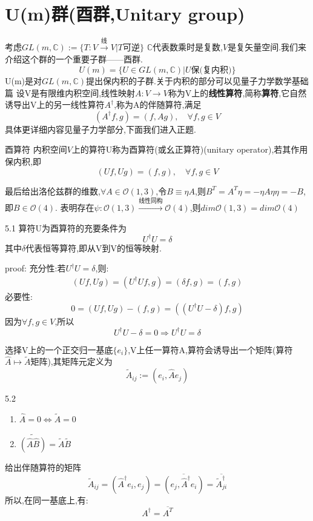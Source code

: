 \documentclass[../main.tex]{subfiles}
\begin{document}
 \section{U(m)群(酉群,Unitary group)}
 考虑$GL(m,\mathbb{C}):= \{T:V\xrightarrow{\text{线}}V|T\text{可逆}\}$ $\mathbb{C}$代表数乘时是复数,$V$是复矢量空间.我们来介绍这个群的一个重要子群——酉群.
 $$U(m) = \{U\in GL(m, \mathbb{C})|U\text{保(复内积)}\}$$
 U(m)是对$GL(m,\mathbb{C})$提出保内积的子群.关于内积的部分可以见量子力学数学基础篇%
 设V是有限维内积空间,线性映射$A:V\rightarrow V$称为V上的\textbf{线性算符},简称\textbf{算符},它自然诱导出V上的另一线性算符$A^\dagger$,称为A的伴随算符,满足
 $$(A^\dagger f,g) = (f,Ag),\quad \forall f,g \in V$$
 具体更详细内容见量子力学部分,下面我们进入正题.
 \begin{definition}{}{酉算符}
     内积空间$V$上的算符U称为酉算符(或幺正算符)(unitary operator),若其作用保内积,即
     $$(Uf,Ug)=(f,g), \quad \forall f,g \in V$$
 \end{definition}最后给出洛伦兹群的维数,$\forall A \in \mathscr{O}(1,3)$,令$B \equiv \eta A$,则$B^T = A^T \eta = -\eta A \eta \eta = -B$,即$B \in \mathscr{O}(4)$.
 表明存在$\psi:\mathscr{O}(1,3) \xrightarrow{\text{线性同构}}  \mathscr{O}(4)$,则$dim\mathscr{O}(1,3) = dim\mathscr{O}(4)$

 \begin{theorem}{}{5.1}
     算符U为酉算符的充要条件为$$U^\dagger U =\delta$$其中$\delta$代表恒等算符,即从V到V的恒等映射.
 \end{theorem}
 proof: 充分性:若$U^\dagger U = \delta$,则:
 \begin{align*}
     (Uf,Ug) = (U^\dagger Uf,g) = (\delta f,g) = (f,g)
 \end{align*}
 必要性:\begin{equation*}
    0 = (Uf,Ug) - (f,g) = ((U^\dagger U - \delta)f,g) 
 \end{equation*}
 因为$\forall f,g \in V$,所以
 $$U^\dagger U - \delta = 0 \Longrightarrow U^\dagger U = \delta$$

 选择V上的一个正交归一基底$\{e_i\}$,V上任一算符A,算符会诱导出一个矩阵(算符$\hat{A}\mapsto \tilde{A}$矩阵),其矩阵元定义为
 $$\tilde{A}_{ij} := (e_i,\hat{A}e_j)$$
 \begin{theorem}{}{5.2}
     \begin{enumerate}
         \item $\hat{A} = 0 \Longleftrightarrow \tilde{A} = 0$
         \item $\widetilde{(\hat{A}\hat{B})} =  \tilde{A}\tilde{B}$
     \end{enumerate}
 \end{theorem}
 给出伴随算符的矩阵
 $$\tilde{A}_{ij} = (\hat{A}^\dagger e_i,e_j) = \overline{(e_j,\hat{A}^\dagger e_i)} = \overline{\tilde{A}^\dagger _{ji}}$$
 所以,在同一基底上,有:
 $$A^\dagger = \overline{A^T}$$
\end{document}
